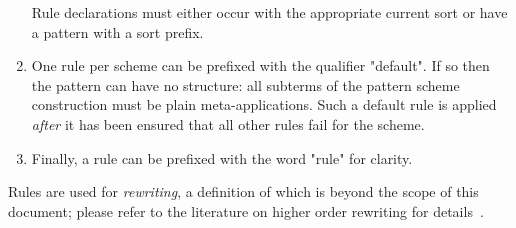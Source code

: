 \documentclass[11pt]{article} %
\begin{document}
\begin{manual}
\begin{enumerate}
    Rule declarations must either occur with the appropriate current sort or have a pattern with a
    sort prefix.

  \item One rule per scheme can be prefixed with the qualifier "default". If so then the pattern can
    have no structure: all subterms of the pattern scheme construction must be plain
    meta-applications. Such a default rule is applied \emph{after} it has been ensured that all
    other rules fail for the scheme.

  \item Finally, a rule can be prefixed with the word "rule" for clarity.

  \end{enumerate}
  Rules are used for \emph{rewriting}, a definition of which is beyond the scope of this document;
  please refer to the literature on higher order rewriting for details~\cite{Klop+:tcs1993}.
\end{manual}
\end{document}
